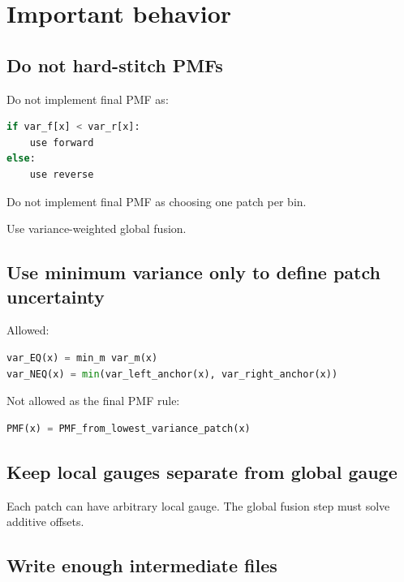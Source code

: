 \documentclass[
  10.5pt,
]{article}
\begin{document}
\section{Important behavior}\label{important-behavior}

\subsection{Do not hard-stitch PMFs}\label{do-not-hard-stitch-pmfs}

Do not implement final PMF as:

\begin{lstlisting}[language=Python]
if var_f[x] < var_r[x]:
    use forward
else:
    use reverse
\end{lstlisting}

Do not implement final PMF as choosing one patch per bin.

Use variance-weighted global fusion.

\subsection{Use minimum variance only to define patch
uncertainty}\label{use-minimum-variance-only-to-define-patch-uncertainty}

Allowed:

\begin{lstlisting}[language=Python]
var_EQ(x) = min_m var_m(x)
var_NEQ(x) = min(var_left_anchor(x), var_right_anchor(x))
\end{lstlisting}

Not allowed as the final PMF rule:

\begin{lstlisting}[language=Python]
PMF(x) = PMF_from_lowest_variance_patch(x)
\end{lstlisting}

\subsection{Keep local gauges separate from global
gauge}\label{keep-local-gauges-separate-from-global-gauge}

Each patch can have arbitrary local gauge. The global fusion step must
solve additive offsets.

\subsection{Write enough intermediate
files}\label{write-enough-intermediate-files}
\end{document}
